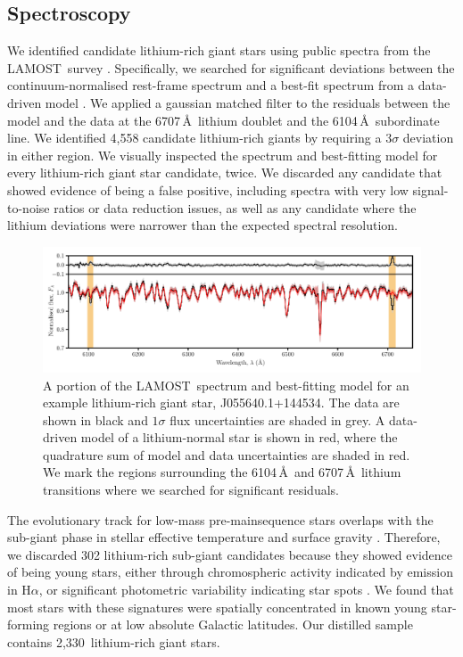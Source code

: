 \documentclass[twocolumn]{aastex62}
\newcommand{\SampleSize}{2,330}
\newcommand\lamost{LAMOST}
\begin{document}
\subsection{Spectroscopy}

We identified candidate lithium-rich giant stars using public spectra from 
the \lamost\ survey \citep{Luo_2015}. Specifically, we searched for significant
deviations between the continuum-normalised rest-frame spectrum 
and a best-fit spectrum from a data-driven model \citep[Figure~\ref{fig:spectrum};][]{Ho_2017a,Ho_2017b}. We applied a gaussian matched filter to the 
residuals between the model and the data at the 6707\,\AA\ lithium doublet 
and the 6104\,\AA\ subordinate line.  We identified 4,558 candidate 
lithium-rich giants by requiring a $3\sigma$ deviation in either region. 
We visually inspected the spectrum and best-fitting model for every 
lithium-rich giant star candidate, twice. We discarded any candidate that 
showed evidence of being a false positive, including spectra with very low
signal-to-noise ratios or data reduction issues, as well as any candidate where the lithium 
deviations were narrower than the expected spectral resolution.

\begin{figure}
    \includegraphics[width=\textwidth]{figure3}
        \caption{A portion of the \lamost\ spectrum and best-fitting model for an example lithium-rich giant star, J055640.1+144534.
        The data are shown in black and $1\sigma$ flux uncertainties are shaded in grey. A data-driven model of a lithium-normal star is shown in red, where the quadrature sum of model and data uncertainties are shaded in red. We mark the regions surrounding the 6104\,\AA\ and 6707\,\AA\ lithium transitions where we searched for significant residuals.}
    \label{fig:spectrum}
\end{figure} 



The evolutionary track for low-mass pre-mainsequence stars overlaps with
the sub-giant phase in stellar effective temperature and surface 
gravity \citep{Dotter_2016,Choi_2016}. Therefore, we discarded 302 
lithium-rich sub-giant candidates because they showed evidence of being 
young stars, either through chromospheric activity indicated by emission 
in H$\alpha$, or significant photometric variability indicating star 
spots \citep{McQuillan_2014}. We found that most stars with these signatures were
spatially concentrated in known young star-forming regions or at low 
absolute Galactic latitudes. Our distilled sample contains \SampleSize\ 
lithium-rich giant stars.
\end{document}
